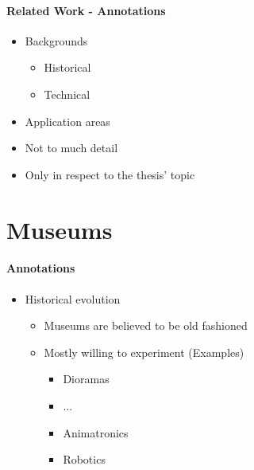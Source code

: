 
\paragraph{Related Work - Annotations}

\begin{itemize}
	\item Backgrounds
	\begin{itemize}
		\item Historical
		\item Technical
	\end{itemize}
	\item Application areas
	\item Not to much detail
	\item Only in respect to the thesis' topic
\end{itemize}


\section{Museums}
\label{related_work_museums}

\paragraph{Annotations}

\begin{itemize}
	\item Historical evolution
	\begin{itemize}
		\item Museums are believed to be old fashioned
		\item Mostly willing to experiment (Examples)
		\begin{itemize}
			\item Dioramas
			\item ...
			\item Animatronics
			\item Robotics
		\end{itemize}
	\end{itemize}
\end{itemize}


